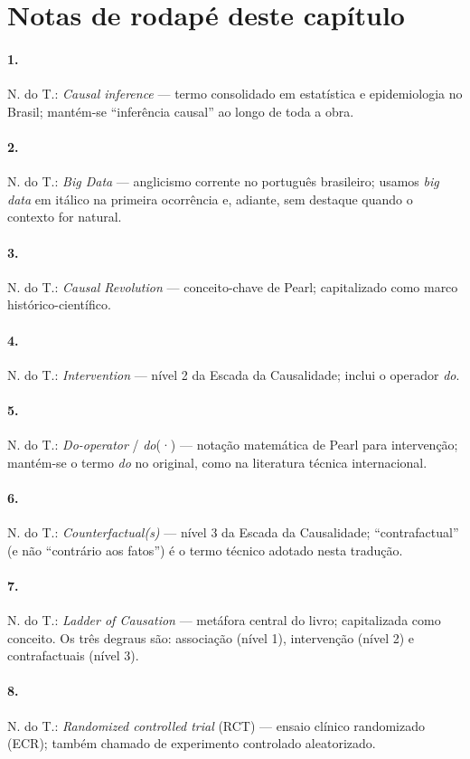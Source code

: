 \documentclass[11pt,a5paper,twoside]{book}
\begin{document}
\section*{Notas de rodapé deste capítulo}
\paragraph{1.} N. do T.: \textit{Causal inference} — termo consolidado em estatística e epidemiologia no Brasil; mantém-se “inferência causal” ao longo de toda a obra.
\paragraph{2.} N. do T.: \textit{Big Data} — anglicismo corrente no português brasileiro; usamos \textit{big data} em itálico na primeira ocorrência e, adiante, sem destaque quando o contexto for natural.
\paragraph{3.} N. do T.: \textit{Causal Revolution} — conceito-chave de Pearl; capitalizado como marco histórico-científico.
\paragraph{4.} N. do T.: \textit{Intervention} — nível 2 da Escada da Causalidade; inclui o operador \textit{do}.
\paragraph{5.} N. do T.: \textit{Do-operator} / \textit{do}(·) — notação matemática de Pearl para intervenção; mantém-se o termo \textit{do} no original, como na literatura técnica internacional.
\paragraph{6.} N. do T.: \textit{Counterfactual(s)} — nível 3 da Escada da Causalidade; “contrafactual” (e não “contrário aos fatos”) é o termo técnico adotado nesta tradução.
\paragraph{7.} N. do T.: \textit{Ladder of Causation} — metáfora central do livro; capitalizada como conceito. Os três degraus são: associação (nível 1), intervenção (nível 2) e contrafactuais (nível 3).
\paragraph{8.} N. do T.: \textit{Randomized controlled trial} (RCT) — ensaio clínico randomizado (ECR); também chamado de experimento controlado aleatorizado.
\end{document}
